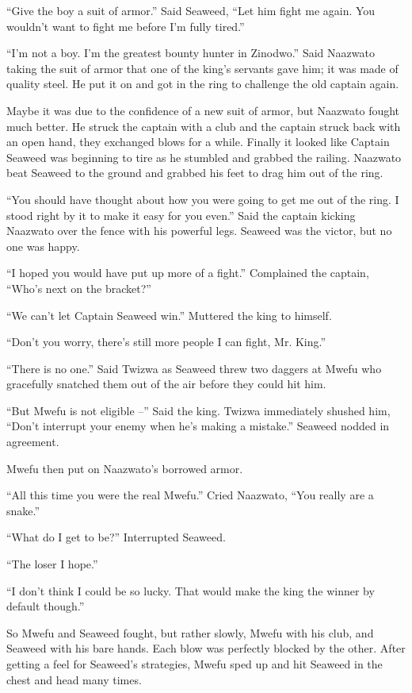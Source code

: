 ``Give the boy a suit of armor.'' Said Seaweed, ``Let him fight me again. You wouldn't want to fight me before I'm fully tired.''

``I'm not a boy. I'm the greatest bounty hunter in Zinodwo.'' Said Naazwato taking the suit of armor that one of the king's servants gave him; it was made of quality steel. He put it on and got in the ring to challenge the old captain again.

Maybe it was due to the confidence of a new suit of armor, but Naazwato fought much better. He struck the captain with a club and the captain struck back with an open hand, they exchanged blows for a while. Finally it looked like Captain Seaweed was beginning to tire as he stumbled and grabbed the railing. Naazwato beat Seaweed to the ground and grabbed his feet to drag him out of the ring.

``You should have thought about how you were going to get me out of the ring. I stood right by it to make it easy for you even.'' Said the captain kicking Naazwato over the fence with his powerful legs.
Seaweed was the victor, but no one was happy.

``I hoped you would have put up more of a fight.'' Complained the captain, ``Who's next on the bracket?''

``We can't let Captain Seaweed win.'' Muttered the king to himself.

``Don't you worry, there's still more people I can fight, Mr. King.''

``There is no one.'' Said Twizwa as Seaweed threw two daggers at Mwefu who gracefully snatched them out of the air before they could hit him. 

``But Mwefu is not eligible --'' Said the king. Twizwa immediately shushed him, ``Don't interrupt your enemy when he's making a mistake.'' Seaweed nodded in agreement.

Mwefu then put on Naazwato's borrowed armor.

``All this time you were the real Mwefu.'' Cried Naazwato, ``You really are a snake.''

``What do I get to be?'' Interrupted Seaweed.

``The loser I hope.''

``I don't think I could be so lucky. That would make the king the winner by default though.''

So Mwefu and Seaweed fought, but rather slowly, Mwefu with his club, and Seaweed with his bare hands.
Each blow was perfectly blocked by the other. After getting a feel for Seaweed's strategies, Mwefu sped up and hit Seaweed in the chest and head many times.

